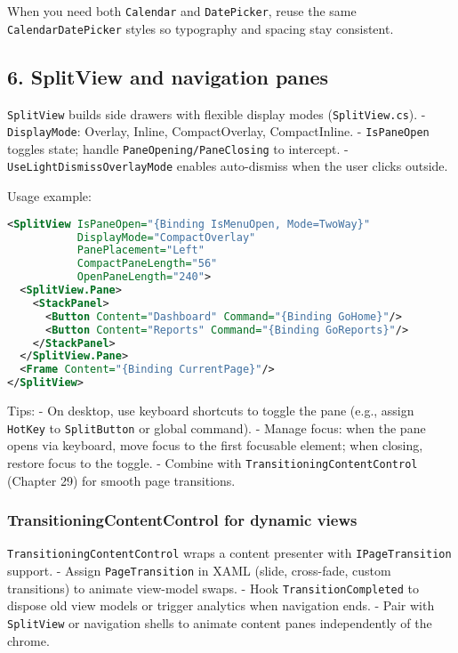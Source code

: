 When you need both \passthrough{\lstinline!Calendar!} and
\passthrough{\lstinline!DatePicker!}, reuse the same
\passthrough{\lstinline!CalendarDatePicker!} styles so typography and
spacing stay consistent.

\subsection{6. SplitView and navigation
panes}\label{splitview-and-navigation-panes}

\passthrough{\lstinline!SplitView!} builds side drawers with flexible
display modes (\passthrough{\lstinline!SplitView.cs!}). -
\passthrough{\lstinline!DisplayMode!}: Overlay, Inline, CompactOverlay,
CompactInline. - \passthrough{\lstinline!IsPaneOpen!} toggles state;
handle \passthrough{\lstinline!PaneOpening/PaneClosing!} to intercept. -
\passthrough{\lstinline!UseLightDismissOverlayMode!} enables
auto-dismiss when the user clicks outside.

Usage example:

\begin{lstlisting}[language=XML]
<SplitView IsPaneOpen="{Binding IsMenuOpen, Mode=TwoWay}"
           DisplayMode="CompactOverlay"
           PanePlacement="Left"
           CompactPaneLength="56"
           OpenPaneLength="240">
  <SplitView.Pane>
    <StackPanel>
      <Button Content="Dashboard" Command="{Binding GoHome}"/>
      <Button Content="Reports" Command="{Binding GoReports}"/>
    </StackPanel>
  </SplitView.Pane>
  <Frame Content="{Binding CurrentPage}"/>
</SplitView>
\end{lstlisting}

Tips: - On desktop, use keyboard shortcuts to toggle the pane (e.g.,
assign \passthrough{\lstinline!HotKey!} to
\passthrough{\lstinline!SplitButton!} or global command). - Manage
focus: when the pane opens via keyboard, move focus to the first
focusable element; when closing, restore focus to the toggle. - Combine
with \passthrough{\lstinline!TransitioningContentControl!} (Chapter 29)
for smooth page transitions.

\subsubsection{TransitioningContentControl for dynamic
views}\label{transitioningcontentcontrol-for-dynamic-views}

\passthrough{\lstinline!TransitioningContentControl!} wraps a content
presenter with \passthrough{\lstinline!IPageTransition!} support. -
Assign \passthrough{\lstinline!PageTransition!} in XAML (slide,
cross-fade, custom transitions) to animate view-model swaps. - Hook
\passthrough{\lstinline!TransitionCompleted!} to dispose old view models
or trigger analytics when navigation ends. - Pair with
\passthrough{\lstinline!SplitView!} or navigation shells to animate
content panes independently of the chrome.

